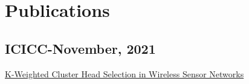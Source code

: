 \documentclass[]{deedy-resume-openfont}
\begin{document}
\begin{minipage}[t]{0.31\textwidth}
\section{Publications}
\subsection{ICICC-November, 2021}
\href{https://link.springer.com/chapter/10.1007/978-981-19-1976-3_4}{K-Weighted Cluster Head Selection in Wireless Sensor Networks} \\






%
%

\end{minipage} 
\hfill
\end{document}
